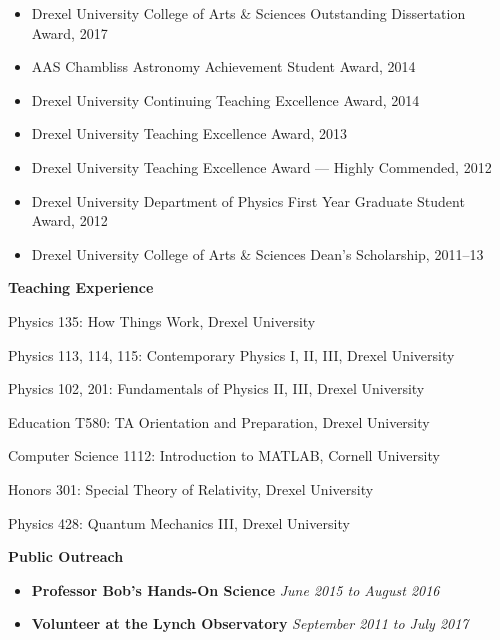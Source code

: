 \begin{vita}
\begin{itemize}[noitemsep]
    \item Drexel University College of Arts \& Sciences Outstanding Dissertation Award, 2017
    \item AAS Chambliss Astronomy Achievement Student Award, 2014
    \item Drexel University Continuing Teaching Excellence Award, 2014
    \item Drexel University Teaching Excellence Award, 2013
    \item Drexel University Teaching Excellence Award --- Highly Commended, 2012
    \item Drexel University Department of Physics First Year Graduate Student Award, 2012
    \item Drexel University College of Arts \& Sciences Dean's Scholarship, 2011--13
\end{itemize}

\noindent
{\large\bf {\sc Teaching Experience}}

\sectionrule

\begin{description}[noitemsep]
    \item[Teaching Assistant] Physics 135: How Things Work, Drexel University
    \item[Teaching Assistant] Physics 113, 114, 115: Contemporary Physics I, II, III, Drexel University
    \item[Teaching Assistant] Physics 102, 201: Fundamentals of Physics II, III, Drexel University
    \item[Teaching Assistant] Education T580: TA Orientation and Preparation, Drexel University
    \item[Teaching Assistant \& Consultant] Computer Science 1112: Introduction to MATLAB, Cornell University
    \item[Grader] Honors 301: Special Theory of Relativity, Drexel University
    \item[Grader] Physics 428: Quantum Mechanics III, Drexel University
\end{description}

\noindent
{\large\bf {\sc Public Outreach}}

\sectionrule

\begin{itemize}[noitemsep]
	\item \textbf{Professor Bob's Hands-On Science} \hfill \textit{June 2015 to August 2016}
	\item \textbf{Volunteer at the Lynch Observatory} \hfill \textit{September 2011 to July 2017}
\end{itemize}

\end{vita}